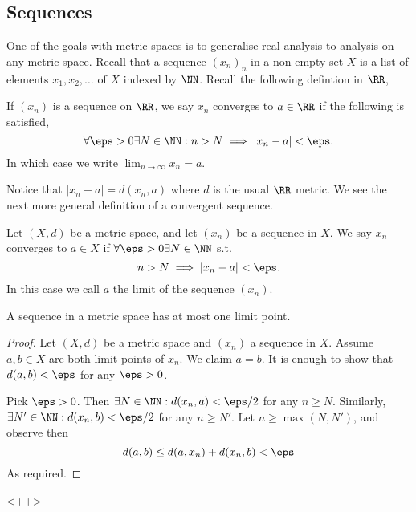 \subsection{Sequences}
One of the goals with metric spaces is to generalise real analysis to analysis
on any metric space. Recall that a sequence $(x_n)_n$ in a non-empty set $X$ is
a list of elements $x_1,x_2,\dots$ of $X$ indexed by $\NN$. Recall the following
defintion in $\RR$,
\begin{definition}
  If $(x_n)$ is a sequence on $\RR$, we say $x_n$ converges to $a\in\RR$ if the
  following is satisfied,
  \[\forall\eps>0 \exists N\in\NN : n>N \implies |x_n-a|<\eps.\]
  In which case we write $\lim_{n\to\infty}x_n=a$.
\end{definition}
Notice that $|x_n-a|=d(x_n,a)$ where $d$ is the usual $\RR$ metric. We see the
next more general definition of a convergent sequence.
\begin{definition}
  Let $(X,d)$ be a metric space, and let $(x_n)$ be a sequence in $X$. We say
  $x_n$ converges to $a\in X$ if $\forall \eps>0\exists N\in\NN$ s.t. 
  \[n>N \implies |x_n-a|<\eps.\]
  In this case we call $a$ the limit of the sequence $(x_n)$.
  \label{def:metricSequence}
\end{definition}
\begin{proposition}
  A sequence in a metric space has at most one limit point.
  \label{prop:uniqueLimitMetricSpace}
\end{proposition}
\begin{proof}
  Let $(X,d)$ be a metric space and $(x_n)$ a sequence in $X$. Assume $a,b\in X$
  are both limit points of $x_n$. We claim $a=b$. It is enough to show that
  $d(a,b)<\eps$ for any $\eps>0$.

  Pick $\eps>0$. Then $\exists N\in\NN : d(x_n,a)<\eps/2$ for any $n\geq N$.
  Similarly, $\exists N'\in\NN : d(x_n,b)<\eps/2$ for any $n\geq N'$. Let $n\geq
  \max (N,N')$, and observe then 
  \[d(a,b)\leq d(a,x_n)+d(x_n,b) < \eps\]
  As required.
\end{proof}<++>
